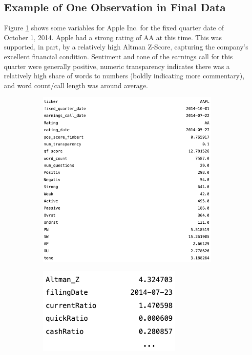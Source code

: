 \documentclass{article}[11pt]
\begin{document}
    \subsection{Example of One Observation in Final Data}

    \label{sec:one-obs-final-data}

    Figure \ref{fig:one-obs-final-data} shows some variables for Apple Inc. for the fixed quarter date of October 1, 2014. Apple had a strong rating of AA at this time. This was supported, in part, by a relatively high Altman Z-Score, capturing the company's excellent financial condition. Sentiment and tone of the earnings call for this quarter were generally positive, numeric transparency indicates there was a relatively high share of words to numbers (boldly indicating more commentary), and word count/call length was around average.

    \begin{figure}[h]
        \caption{Apple Inc., October 1, 2014}
        \begin{subfigure}[h]{0.4925\textwidth}
            \centering
            \includegraphics[width=0.95\hsize]{../Output/NLP/aapl nlp.png}
        \end{subfigure}
        \begin{subfigure}[h]{0.4925\textwidth}
            \centering
            \includegraphics[width=0.5\hsize]{../Output/NLP/aapl fin.png}
        \end{subfigure}
        \hfill
        \label{fig:one-obs-final-data}
    \end{figure}
\end{document}
